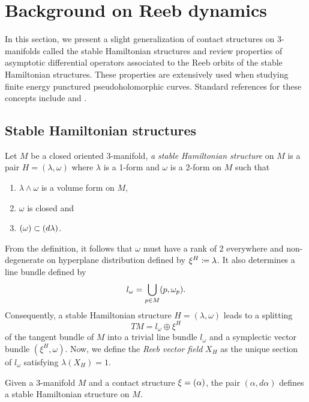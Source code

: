 \documentclass[11pt, a4paper]{amsart}
\let\ker\relax
\DeclareMathOperator{\ker}{Ker}
\begin{document}
\section{Background on Reeb dynamics} \label{section: background on Reeb dynamics}
In this section, we present a slight generalization of contact structures on 3-manifolds called the stable Hamiltonian structures and review properties of asymptotic differential operators associated to the Reeb orbits of the stable Hamiltonian structures. These properties are extensively used when studying finite energy punctured pseudoholomorphic curves. Standard references for these concepts include \cite{SFTwendl} and \cite{Siefinter2009}.

\subsection{Stable Hamiltonian structures}\label{subsec: Stable Hamiltonian structures}
\begin{definition}\label{hamiltonian_structure}
Let $M$ be a closed oriented 3-manifold, \textit{a stable Hamiltonian structure} on $M$ is a pair $H = (\lambda, \omega)$ where $\lambda$ is a 1-form and $\omega$ is a 2-form on $M$ such that 
\begin{enumerate} 
    \itemsep0.2em
    \item $\lambda \wedge \omega$ is a volume form on $M$,
    \item $\omega$ is closed and 
    \item $\ker(\omega)\subset \ker(d\lambda)$.
\end{enumerate}
\end{definition}


From the definition, it follows that $\omega$ must have a rank of 2 everywhere and non-degenerate on hyperplane distribution defined by $\xi^{H} \coloneqq \ker \lambda$. It also determines a line bundle defined by $$l_{\omega} = \bigcup\limits_{p\in M} (p, \ker \omega_p).$$
Consequently, a stable Hamiltonian structure $H = (\lambda, \omega)$ leads to a splitting
\begin{equation*}\label{splitting_hamiltonian}
TM = l_{\omega} \oplus \xi^H
\end{equation*}
of the tangent bundle of $M$ into a trivial line bundle $l_{\omega}$ and a symplectic vector bundle $(\xi^{H}, \omega)$. Now, we define the \textit{Reeb vector field} $X_H$ as the unique section of $l_{\omega}$ satisfying $\lambda(X_{H}) = 1$.


\begin{example}
Given a 3-manifold $M$ and a contact structure $\xi=\ker (\alpha)$, the pair $(\alpha,d\alpha)$ defines a stable Hamiltonian structure on $M$. 
\end{example}
\end{document}
